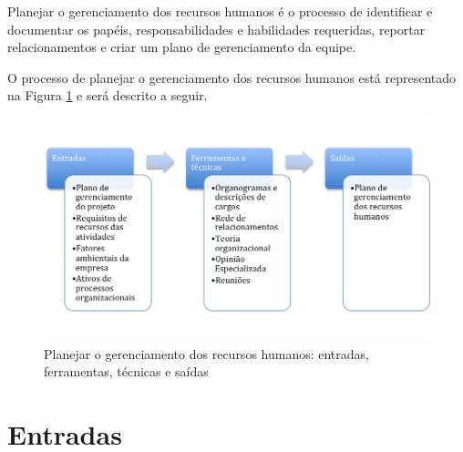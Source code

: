 
Planejar o gerenciamento dos recursos humanos é o processo de identificar e documentar os papéis, responsabilidades e habilidades requeridas, reportar relacionamentos e criar um plano de gerenciamento da equipe.

O processo de planejar o gerenciamento dos recursos humanos está representado na Figura \ref{fig:rh:plan:efts} e será descrito a seguir.

\begin{figure}[!h]
	\centering
	\includegraphics[scale=0.5]{Figuras/rh_efts_planejar.png}
	\caption{Planejar o gerenciamento dos recursos humanos: entradas, ferramentas, técnicas e saídas}
	\label{fig:rh:plan:efts}
\end{figure}

\section{Entradas}

